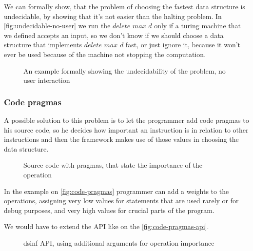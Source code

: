 \documentclass[a4paper,11pt]{article}
\begin{document}
        We can formally show, that the problem of choosing the fastest data structure is undecidable, by showing that
        it's not easier than the halting problem. In \autoref{fig:undecidable-no-user} we run the $delete\_max\_d$ only
        if a turing machine that we defined accepts an input, so we don't know if we should choose a data structure that
        implements $delete\_max\_d$ fast, or just ignore it, because it won't ever be used because of the machine not
        stopping the computation.

        \begin{figure}
			

			\caption{An example formally showing the undecidability of the problem, no user interaction}

			\label{fig:undecidable-no-user}
		\end{figure}

		\subsubsection{Code pragmas} \label{sec:pragmas}

			A possible solution to this problem is to let the programmer add code pragmas to his source
			code, so he decides how important an instruction is in relation to other instructions and then
			the framework makes use of those values in choosing the data structure.

            \begin{figure}[!h]
				

				\caption{Source code with pragmas, that state the importance of the operation}

				\label{fig:code-pragmas}
			\end{figure}

            In the example on \autoref{fig:code-pragmas} programmer can add a weights to the operations, assigning very low values
			for statements that are used rarely or for debug purposes, and very high values for crucial
			parts of the program.

            We would have to extend the API like on the \autoref{fig:code-pragmas-api}.

            \begin{figure}[!h]
				

				\caption{dsinf API, using additional arguments for operation importance}

				\label{fig:code-pragmas-api}
			\end{figure}
\end{document}
